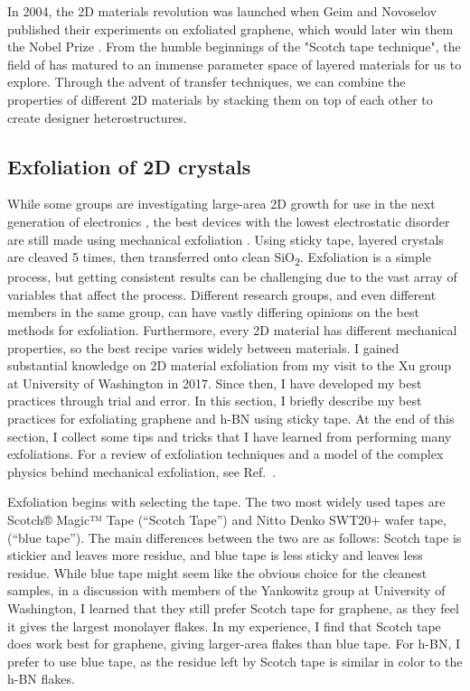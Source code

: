 \documentclass[double,12pt,1in,seploa]{beavtex}
\let\Oldsubsection\subsection
\renewcommand{\subsection}{\FloatBarrier\Oldsubsection}
\begin{document}
In 2004, the 2D materials revolution was launched when Geim and Novoselov published their experiments on exfoliated graphene, which would later win them the Nobel Prize \cite{novoselov_electric_2004}. From the humble beginnings of the "Scotch tape technique", the field of has matured to an immense parameter space of layered materials for us to explore. Through the advent of transfer techniques, we can combine the properties of different 2D materials by stacking them on top of each other to create designer heterostructures.

\subsection{Exfoliation of 2D crystals}

While some groups are investigating large-area 2D growth for use in the next generation of electronics \cite{quellmalz_large-area_2021}, the best devices with the lowest electrostatic disorder are still made using mechanical exfoliation \cite{xin_giant_2023}. Using sticky tape, layered crystals are cleaved 5 times, then transferred onto clean SiO\textsubscript{2}. Exfoliation is a simple process, but getting consistent results can be challenging due to the vast array of variables that affect the process. Different research groups, and even different members in the same group, can have vastly differing opinions on the best methods for exfoliation. Furthermore, every 2D material has different mechanical properties, so the best recipe varies widely between materials. I gained substantial knowledge on 2D material exfoliation from my visit to the Xu group at University of Washington in 2017. Since then, I have developed my best practices through trial and error. In this section, I briefly describe my best practices for exfoliating graphene and h-BN using sticky tape. At the end of this section, I collect some tips and tricks that I have learned from performing many exfoliations. For a review of exfoliation techniques and a model of the complex physics behind mechanical exfoliation, see Ref.\ \cite{islam_exfoliation_2022}.

Exfoliation begins with selecting the tape. The two most widely used tapes are Scotch® Magic™ Tape (“Scotch Tape”) and Nitto Denko SWT20+ wafer tape, (“blue tape”). The main differences between the two are as follows: Scotch tape is stickier and leaves more residue, and blue tape is less sticky and leaves less residue. While blue tape might seem like the obvious choice for the cleanest samples, in a discussion with members of the Yankowitz group at University of Washington, I learned that they still prefer Scotch tape for graphene, as they feel it gives the largest monolayer flakes. In my experience, I find that Scotch tape does work best for graphene, giving larger-area flakes than blue tape. For h-BN, I prefer to use blue tape, as the residue left by Scotch tape is similar in color to the h-BN flakes.
\end{document}
